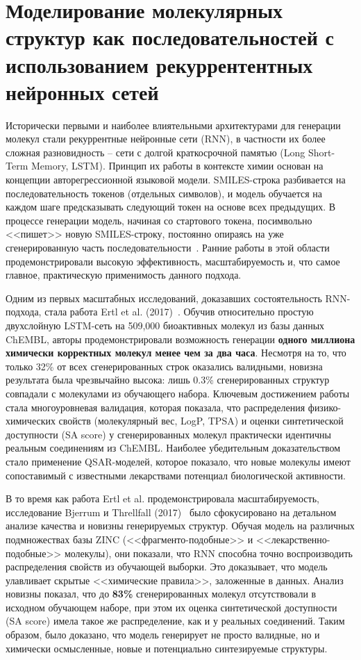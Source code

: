 

\section{Моделирование молекулярных структур как последовательностей с использованием рекуррентентных нейронных сетей}
\label{sec:rnn}

Исторически первыми и наиболее влиятельными архитектурами для генерации молекул стали рекуррентные нейронные сети (RNN), в частности их более сложная разновидность -- сети с долгой краткосрочной памятью (Long Short-Term Memory, LSTM). Принцип их работы в контексте химии основан на концепции авторегрессионной языковой модели. SMILES-строка разбивается на последовательность токенов (отдельных символов), и модель обучается на каждом шаге предсказывать следующий токен на основе всех предыдущих. В процессе генерации модель, начиная со стартового токена, посимвольно <<пишет>> новую SMILES-строку, постоянно опираясь на уже сгенерированную часть последовательности~\cite{wigh2022review}. Ранние работы в этой области продемонстрировали высокую эффективность, масштабируемость и, что самое главное, практическую применимость данного подхода.

Одним из первых масштабных исследований, доказавших состоятельность RNN-подхода, стала работа Ertl et al. (2017)~\cite{ertl2017silico}. Обучив относительно простую двухслойную LSTM-сеть на 509,000 биоактивных молекул из базы данных ChEMBL, авторы продемонстрировали возможность генерации \textbf{одного миллиона химически корректных молекул менее чем за два часа}. Несмотря на то, что только 32\% от всех сгенерированных строк оказались валидными, новизна результата была чрезвычайно высока: лишь 0.3\% сгенерированных структур совпадали с молекулами из обучающего набора. Ключевым достижением работы стала многоуровневая валидация, которая показала, что распределения физико-химических свойств (молекулярный вес, LogP, TPSA) и оценки синтетической доступности (SA score) у сгенерированных молекул практически идентичны реальным соединениям из ChEMBL. Наиболее убедительным доказательством стало применение QSAR-моделей, которое показало, что новые молекулы имеют сопоставимый с известными лекарствами потенциал биологической активности.

В то время как работа Ertl et al. продемонстрировала масштабируемость, исследование Bjerrum и Threllfall (2017)~\cite{bjerrum2017molecular} было сфокусировано на детальном анализе качества и новизны генерируемых структур. Обучая модель на различных подмножествах базы ZINC (<<фрагменто-подобные>> и <<лекарственно-подобные>> молекулы), они показали, что RNN способна точно воспроизводить распределения свойств из обучающей выборки. Это доказывает, что модель улавливает скрытые <<химические правила>>, заложенные в данных. Анализ новизны показал, что до \textbf{83\%} сгенерированных молекул отсутствовали в исходном обучающем наборе, при этом их оценка синтетической доступности (SA score) имела такое же распределение, как и у реальных соединений. Таким образом, было доказано, что модель генерирует не просто валидные, но и химически осмысленные, новые и потенциально синтезируемые структуры.

